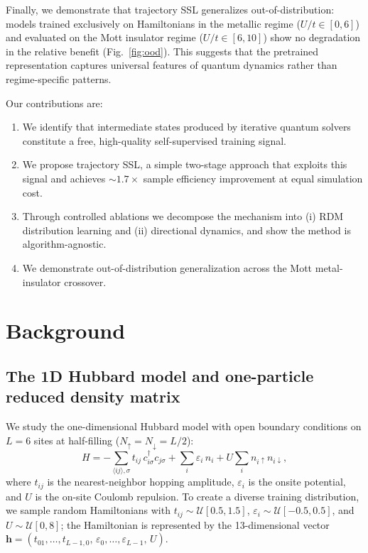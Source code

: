 \documentclass[12pt]{article}
\newcommand{\Hv}{\mathbf{h}}
\begin{document}
Finally, we demonstrate that trajectory SSL generalizes out-of-distribution:
models trained exclusively on Hamiltonians in the metallic regime
($U/t \in [0, 6]$) and evaluated on the Mott insulator regime
($U/t \in [6, 10]$) show no degradation in the relative benefit (Fig.~\ref{fig:ood}).
This suggests that the pretrained representation captures universal features of
quantum dynamics rather than regime-specific patterns.

Our contributions are:
\begin{enumerate}
  \item We identify that intermediate states produced by iterative quantum solvers
    constitute a free, high-quality self-supervised training signal.
  \item We propose trajectory SSL, a simple two-stage approach that exploits this
    signal and achieves ${\sim}1.7\times$ sample efficiency improvement at equal
    simulation cost.
  \item Through controlled ablations we decompose the mechanism into (i) RDM
    distribution learning and (ii) directional dynamics, and show the method is
    algorithm-agnostic.
  \item We demonstrate out-of-distribution generalization across the
    Mott metal-insulator crossover.
\end{enumerate}

\section{Background}
\label{sec:background}

\subsection{The 1D Hubbard model and one-particle reduced density matrix}

We study the one-dimensional Hubbard model with open boundary conditions on $L=6$
sites at half-filling ($N_\uparrow = N_\downarrow = L/2$):
\begin{equation}
  H = -\sum_{\langle ij\rangle,\sigma} t_{ij}\, c^\dagger_{i\sigma} c_{j\sigma}
      + \sum_i \varepsilon_i\, n_i
      + U \sum_i n_{i\uparrow} n_{i\downarrow},
\label{eq:hubbard}
\end{equation}
where $t_{ij}$ is the nearest-neighbor hopping amplitude, $\varepsilon_i$ is the
onsite potential, and $U$ is the on-site Coulomb repulsion.
To create a diverse training distribution, we sample random Hamiltonians with
$t_{ij} \sim \mathcal{U}[0.5, 1.5]$, $\varepsilon_i \sim \mathcal{U}[-0.5, 0.5]$,
and $U \sim \mathcal{U}[0, 8]$; the Hamiltonian is represented by the
13-dimensional vector $\Hv = (t_{01}, \ldots, t_{L-1,0},\,\varepsilon_0,\ldots,\varepsilon_{L-1},\,U)$.
\end{document}
